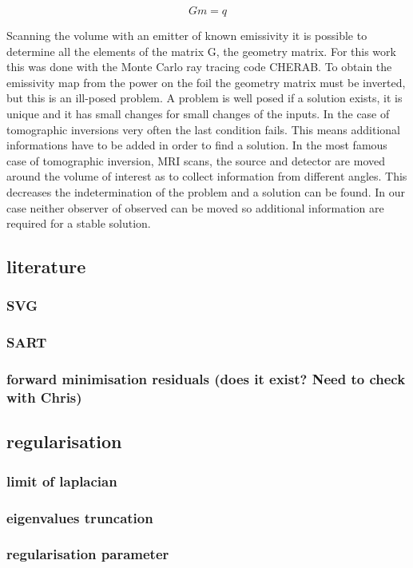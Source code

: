 \begin{equation}
Gm=q
\label{eq:gmq}
\end{equation}

Scanning the volume with an emitter of known emissivity it is possible to determine all the elements of the matrix G, the geometry matrix. For this work this was done with the Monte Carlo ray tracing code CHERAB. To obtain the emissivity map from the power on the foil the geometry matrix must be inverted, but this is an ill-posed problem. A problem is well posed if a solution exists, it is unique and it has small changes for small changes of the inputs. \cite{Hansen1998} In the case of tomographic inversions very often the last condition fails. \cite{Hansen2010} This means additional informations have to be added in order to find a solution. In the most famous case of tomographic inversion, MRI scans, the source and detector are moved around the volume of interest as to collect information from different angles. This decreases the indetermination of the problem and a solution can be found. In our case neither observer of observed can be moved so additional information are required for a stable solution.
\subsection{literature}
\subsubsection{SVG}
\subsubsection{SART}
\subsubsection{forward minimisation residuals (does it exist? Need to check with Chris)}
\subsection{regularisation}
\subsubsection{limit of laplacian}
\subsubsection{eigenvalues truncation}
\subsubsection{regularisation parameter}
